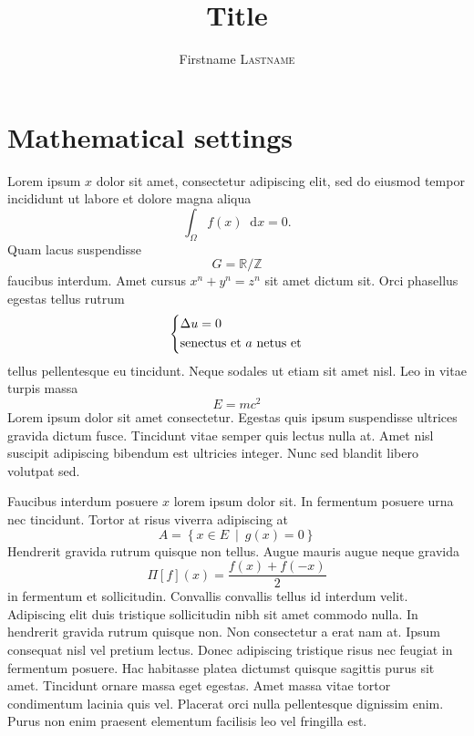 \documentclass[12pt,a4paper]{article}
\title{Title}
\author{Firstname \textsc{Lastname}}
\date{}
\newcommand{\bbR}{\mathbb{R}}
\newcommand{\bbZ}{\mathbb{Z}}
\newcommand{\di}[1]{\mathop{}\!\mathrm{d}#1}
\newcommand{\setst}[2]{\left\lbrace#1\ \middle\vert\ #2\right\rbrace}
\theoremstyle{definition}
\theoremstyle{plain}
\theoremstyle{remark}
\begin{document}
\maketitle

\tableofcontents


\section{Mathematical settings}

Lorem ipsum \( x \) dolor sit amet, consectetur adipiscing elit, sed do eiusmod tempor incididunt ut labore et dolore magna aliqua
\[
    \int_\Omega f(x) \di{x} = 0.
\]
Quam lacus suspendisse \[
    G = \bbR / \bbZ
\] faucibus interdum.
Amet cursus
\( x^n + y^n = z^n \)
sit amet dictum sit.
Orci phasellus egestas tellus rutrum
\[
    \begin{dcases}
        \Delta u = 0 \\
        \text{senectus et \( a \) netus et}
    \end{dcases}
\]
tellus pellentesque eu tincidunt. Neque sodales ut etiam sit amet nisl.
Leo in vitae turpis massa
\[
    E = m c^2 %
\]
Lorem ipsum dolor sit amet consectetur.
Egestas quis ipsum suspendisse ultrices gravida dictum fusce.
Tincidunt vitae semper quis lectus nulla at.
%
\]
Amet nisl suscipit adipiscing bibendum est ultricies integer.
Nunc sed blandit libero volutpat sed.

Faucibus interdum posuere \( x \) lorem ipsum dolor sit.
In fermentum posuere urna nec tincidunt.
Tortor at risus viverra adipiscing at
\[
    A = \setst{x \in E}{g(x) = 0} %
\]
\]
Hendrerit gravida rutrum quisque non tellus.
Augue mauris augue neque gravida \[
    \Pi[f](x) = \frac{f(x) + f(-x)}{2}
\] in fermentum et sollicitudin.
Convallis convallis tellus id interdum velit.
Adipiscing elit duis tristique sollicitudin nibh sit amet commodo nulla.
%
\]
In hendrerit gravida rutrum quisque non.
Non consectetur a erat nam at.
Ipsum consequat nisl vel pretium lectus.
\]
Donec adipiscing tristique risus nec feugiat in fermentum posuere.
Hac habitasse platea dictumst quisque sagittis purus sit amet.
Tincidunt ornare massa eget egestas.
Amet massa vitae tortor condimentum lacinia quis vel.
Placerat orci nulla pellentesque dignissim enim.
Purus non enim praesent elementum facilisis leo vel fringilla est.
\end{document}
